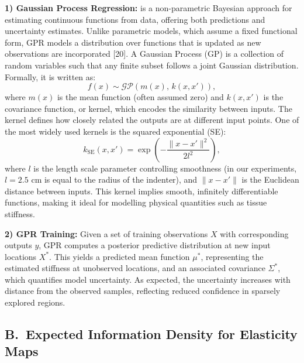 \documentclass[11pt]{article}
\begin{document}
\textbf{1) Gaussian Process Regression:} is a non-parametric Bayesian
approach for estimating continuous functions from data, offering
both predictions and uncertainty estimates. Unlike parametric
models, which assume a fixed functional form, GPR models a
distribution over functions that is updated as new observations are
incorporated [20]. A Gaussian Process (GP) is a collection of random
variables such that any finite subset follows a joint Gaussian
distribution. Formally, it is written as:
\[
  f(x) \sim \mathcal{GP}(m(x),\, k(x, x')),
\]
where $m(x)$ is the mean function (often assumed zero) and
$k(x, x')$ is the covariance function, or kernel, which encodes the
similarity between inputs. The kernel defines how closely related
the outputs are at different input points. One of the most widely
used kernels is the squared exponential (SE):
\[
  k_{\mathrm{SE}}(x, x') =
  \exp\!\left(-\frac{\|x - x'\|^{2}}{2 l^{2}}\right),
\]
where $l$ is the length scale parameter controlling smoothness
(in our experiments, $l = 2.5$ cm is equal to the radius of the
indenter), and $\|x - x'\|$ is the Euclidean distance between
inputs. This kernel implies smooth, infinitely differentiable
functions, making it ideal for modelling physical quantities such
as tissue stiffness.

\textbf{2) GPR Training:} Given a set of training observations $X$
with corresponding outputs $y$, GPR computes a posterior predictive
distribution at new input locations $X^{*}$. This yields a predicted
mean function $\mu^{*}$, representing the estimated stiffness at
unobserved locations, and an associated covariance $\Sigma^{*}$,
which quantifies model uncertainty. As expected, the uncertainty
increases with distance from the observed samples, reflecting
reduced confidence in sparsely explored regions.

\subsection*{B.\ Expected Information Density for Elasticity Maps}
\end{document}
